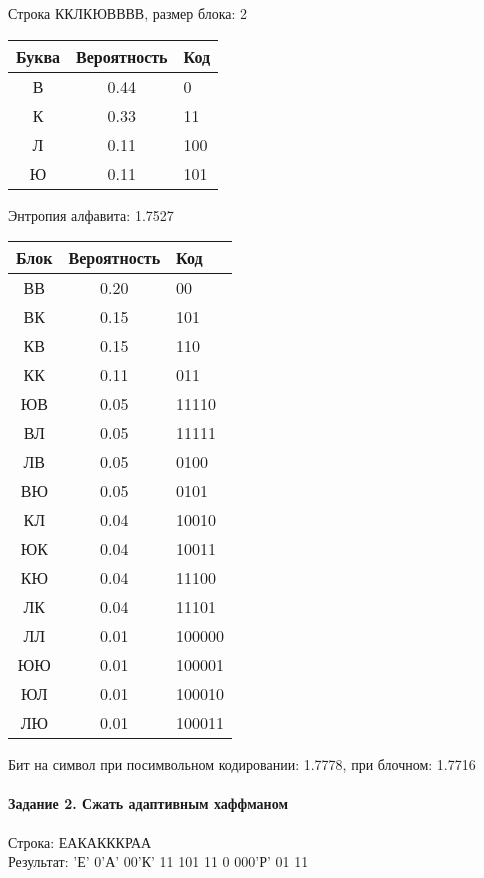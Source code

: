 \documentclass[a4paper, 12pt]{article}
\begin{document}
Строка ККЛКЮВВВВ, размер блока: 2
\begin{center}
 \begin{tabular}{ |c|c|l| } 
  \hline
     Буква & Вероятность & Код\\ \hline
В & 0.44 & 0\\\hline
К & 0.33 & 11\\\hline
Л & 0.11 & 100\\\hline
Ю & 0.11 & 101
\\ \hline \end{tabular}
\end{center}
Энтропия алфавита: 1.7527
\begin{center}
 \begin{tabular}{ |c|c|l| } 
  \hline
     Блок & Вероятность & Код\\ \hline
ВВ & 0.20 & 00\\\hline
ВК & 0.15 & 101\\\hline
КВ & 0.15 & 110\\\hline
КК & 0.11 & 011\\\hline
ЮВ & 0.05 & 11110\\\hline
ВЛ & 0.05 & 11111\\\hline
ЛВ & 0.05 & 0100\\\hline
ВЮ & 0.05 & 0101\\\hline
КЛ & 0.04 & 10010\\\hline
ЮК & 0.04 & 10011\\\hline
КЮ & 0.04 & 11100\\\hline
ЛК & 0.04 & 11101\\\hline
ЛЛ & 0.01 & 100000\\\hline
ЮЮ & 0.01 & 100001\\\hline
ЮЛ & 0.01 & 100010\\\hline
ЛЮ & 0.01 & 100011
\\ \hline \end{tabular}
\end{center}
Бит на символ при посимвольном кодировании: 1.7778, при блочном: 1.7716


\pagebreak
\paragraph{Задание 2. Сжать адаптивным хаффманом\\}

Строка: 
ЕАКАКККРАА\\
Результат: 'Е' 0'А' 00'К' 11 101 11 0 000'Р' 01 11
\end{document}
